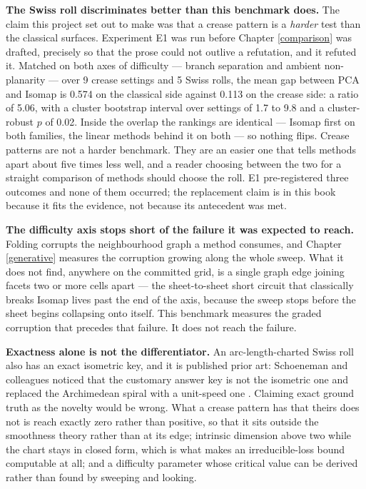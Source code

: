 \documentclass[
  british,
  a4paper,
]{book}
\newcounter{none} %
\begin{document}
\textbf{The Swiss roll discriminates better than this benchmark does.} The claim this
project set out to make was that a crease pattern is a \emph{harder} test than the
classical surfaces. Experiment E1 was run before Chapter \ref{comparison} was
drafted, precisely so that the prose could not outlive a refutation, and it
refuted it. Matched on both axes of difficulty --- branch separation and ambient
non-planarity --- over 9 crease
settings and 5 Swiss rolls,
the mean gap between PCA and Isomap is 0.574 on the classical
side against 0.113 on the crease side: a ratio of
5.06, with a cluster bootstrap interval over settings of
1.7 to 9.8 and a cluster-robust \(p\) of
0.02. Inside the overlap the rankings are identical --- Isomap first
on both families, the linear methods behind it on both --- so nothing flips.
Crease patterns are not a harder benchmark. They are an easier one that tells
methods apart about five times less well, and a reader choosing between the two
for a straight comparison of methods should choose the roll. E1 pre-registered
three outcomes and none of them occurred; the replacement claim is in this book
because it fits the evidence, not because its antecedent was met.

\textbf{The difficulty axis stops short of the failure it was expected to reach.}
Folding corrupts the neighbourhood graph a method consumes, and Chapter
\ref{generative} measures the corruption growing along the whole sweep. What it
does not find, anywhere on the committed grid, is a single graph edge joining
facets two or more cells apart --- the sheet-to-sheet short circuit that
classically breaks Isomap \citep{balasubramanian2002isomap} lives past the end of the
axis, because the sweep stops before the sheet begins collapsing onto itself.
This benchmark measures the graded corruption that precedes that failure. It
does not reach the failure.

\textbf{Exactness alone is not the differentiator.} An arc-length-charted Swiss roll
also has an exact isometric key, and it is published prior art: Schoeneman and
colleagues noticed that the customary answer key is not the isometric one and
replaced the Archimedean spiral with a unit-speed one \citep{schoeneman2017error}.
Claiming exact ground truth as the novelty would be wrong. What a crease pattern
has that theirs does not is reach exactly zero rather than positive, so that it
sits outside the smoothness theory rather than at its edge; intrinsic dimension
above two while the chart stays in closed form, which is what makes an
irreducible-loss bound computable at all; and a difficulty parameter whose
critical value can be derived rather than found by sweeping and looking.
\end{document}
